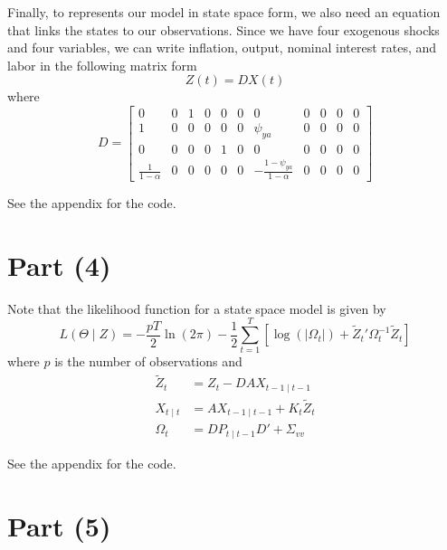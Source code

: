 \documentclass[12pt]{article}
\theoremstyle{definition}
\newcommand{\inv}{^{-1}}
\newcommand{\bra}[1]{\left[#1\right]}
\newcommand{\mat}[1]{\begin{matrix}#1\end{matrix}}
\newcommand{\bmat}[1]{\bra{\mat{#1}}}
\begin{document}
Finally, to represents our model in state space form, we also need an equation that links the states to our observations. Since we have four exogenous shocks and four variables, we can write inflation, output, nominal interest rates, and labor in the following matrix form
\[
Z(t) = DX(t)
\]
where 
\[
D = \bmat{0& 0&1 &0& 0& 0& 0& 0& 0& 0& 0\\
	1& 0& 0& 0& 0& 0& \psi_{ya}& 0& 0& 0& 0\\
	0& 0& 0& 0& 1& 0& 0& 0& 0& 0& 0\\
	\frac{1}{1-\alpha}& 0& 0& 0& 0& 0& -\frac{1-\psi_{ya}}{1-\alpha}& 0& 0& 0& 0}
\]

See the appendix for the code.

\section*{Part (4)}

Note that the likelihood function for a state space model is given by
\[
L(\Theta \mid Z) = -\frac{pT}{2}\ln(2\pi) -\frac{1}{2}\sum_{t=1}^{T}\left[ \log(|\Omega_t|) + \tilde{Z}_t'\Omega_t\inv \tilde{Z}_t\right] 
\]
where $p$ is the number of observations and
\begin{align*}
	\tilde{Z}_t & = Z_t - DAX_{t-1\mid t-1}\\
	X_{t\mid t} & = AX_{t-1\mid t-1} + K_t\tilde{Z}_t\\
	\Omega_t & = DP_{t\mid t-1}D'+\Sigma_{vv}
\end{align*}

See the appendix for the code.
\section*{Part (5)}
\end{document}
